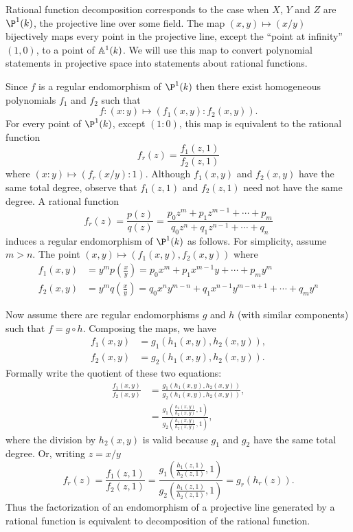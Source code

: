 Rational function decomposition corresponds to the case when $X$, $Y$
and $Z$ are $\P^1(k)$, the projective line over some field.  The map
$(x,y) \mapsto (x/y)$ bijectively maps every point in the projective line,
except the ``point at infinity'' $(1, 0)$, to a point of $\mathbb{A}^1(k)$.
We will use this map to convert polynomial statements in projective
space into statements about rational functions.

Since $f$ is a regular endomorphism of $\P^1(k)$ then there exist
homogeneous polynomials $f_1$ and $f_2$ such that
\[
f : (x: y) \mapsto (f_1(x, y) : f_2(x, y)).
\]
For every point of $\P^1(k)$, except $(1 : 0)$, this map is equivalent to
the rational function
\[
f_r(z) = \frac{f_1(z, 1)}{f_2(z, 1)}
\]
where $(x : y) \mapsto (f_r(x/y) : 1)$.  Although $f_1(x, y)$ and
$f_2(x, y)$ have the same total degree, observe that $f_1(z, 1)$ and
$f_2(z, 1)$ need not have the same degree.  A rational function
\[
f_r(z) = \frac{p(z)}{q(z)} 
= \frac{p_{0} z^m + p_{1} z^{m-1} + \cdots + p_{m}}{q_0 z^n + q_1
z^{n-1} + \cdots + q_n}
\]
induces a regular endomorphism of $\P^1(k)$ as follows.  For
simplicity, assume $m > n$.  The point $(x, y) \mapsto (f_1(x, y),
f_2(x, y))$ where
\[
\begin{aligned}
f_1(x, y) &= y^m p\left(\frac{x}{y}\right) = p_0 x^m + p_1 x^{m-1} y +
\cdots + p_m y^m \\
f_2(x, y) &= y^m q\left(\frac{x}{y}\right) = q_0 x^n y^{m-n} + q_1 x^{n-1} y^{m-n+1} +
\cdots + q_m y^n 
\end{aligned}
\]

Now assume there are regular endomorphisms $g$ and $h$ (with similar
components) such that $f = g \circ h$.  Composing the maps, we have
\[
\begin{aligned}
f_1(x, y) & = g_1(h_1(x,y), h_2(x,y)), \\
f_2(x, y) & = g_2(h_1(x,y), h_2(x,y)).
\end{aligned}
\]
Formally write the quotient of these two equations:
\[
\begin{aligned}
\frac{f_1(x, y)}{f_2(x, y)} 
    & = \frac{g_1(h_1(x,y), h_2(x,y))}{g_2(h_1(x,y), h_2(x,y))}, \\
    & = \frac{g_1(\frac{h_1(x,y)}{h_2(x,y)},1)}{g_2(\frac{h_1(x,y)}{h_2(x,y)}, 1)},
\end{aligned}
\]
where the division by $h_2(x, y)$ is valid because $g_1$ and $g_2$
have the same total degree.  Or, writing $z = x/y$
\[
f_r(z) = \frac{f_1(z,1)}{f_2(z,1)} 
 = \frac{g_1(\frac{h_1(z,1)}{h_2(z,1)},1)}{g_2(\frac{h_1(z,1)}{h_2(z,1)}, 1)}
 = g_r(h_r(z)).
\]
Thus the factorization of an endomorphism of a projective line
generated by a rational function is equivalent to decomposition of the
rational function.

